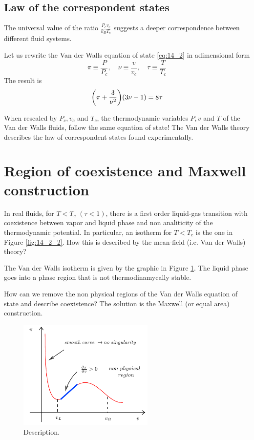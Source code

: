 \documentclass[../main/main.tex]{subfiles}
\begin{document}
\subsection{Law of the correspondent states}
The universal value of the ratio \( \frac{P_c v_c}{k_B T_c} \) suggests a deeper correspondence between different fluid systems.

Let us rewrite the Van der Walls equation of state \eqref{eq:14_2} in adimensional form
\begin{equation}
  \pi \equiv \frac{P}{P_c}, \quad \nu  \equiv \frac{v}{v_c}, \quad \tau \equiv \frac{T}{T_c}
\end{equation}
The result is
\begin{equation}
  \qty(\pi + \frac{3}{\nu ^2}) \qty(3 \nu -1) = 8 \tau
\end{equation}
\begin{remark}
When rescaled by \( P_c, v_c \) and \( T_c \), the thermodynamic variables \( P,v \) and \( T \) of the Van der Walls fluids, follow the same equation of state! The Van der Walls theory describes the law of correspondent states found experimentally.
\end{remark}

\section{Region of coexistence and Maxwell construction}
In real fluids, for \( T < T_c \) \( (\tau < 1) \), there is a first order liquid-gas transition with coexistence between vapor and liquid phase and non analiticity of the thermodynamic potential. In particular, an isotherm for \( T < T_c \) is the one in Figure \ref{fig:14_2_2}. How this is described by the mean-field (i.e. Van der Walls) theory?

The Van der Walls isotherm is given by the graphic in Figure \ref{fig:14_3}.
The liquid phase goes into a phase region that is not thermodinamycally stable.

How can we remove the non physical regions of the Van der Walls equation of state and describe coexistence? The solution is the Maxwell (or equal area) construction.

\begin{figure}[h!]
\centering
\includegraphics[width=0.6\textwidth]{../lessons/14_image/4.pdf}
\caption{\label{fig:14_3} Description.}
\end{figure}
\end{document}

